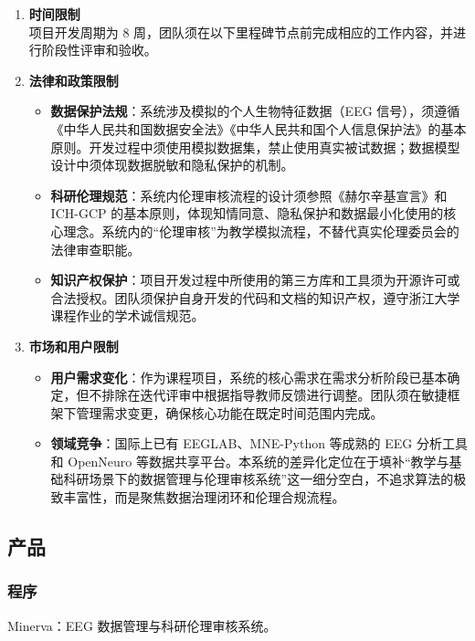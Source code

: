 \begin{enumerate}[(1)]
  \item \textbf{时间限制}\\
  项目开发周期为 8 周，团队须在以下里程碑节点前完成相应的工作内容，并进行阶段性评审和验收。

  \item \textbf{法律和政策限制}
    \begin{itemize}
      \item \textbf{数据保护法规}：系统涉及模拟的个人生物特征数据（EEG 信号），须遵循《中华人民共和国数据安全法》《中华人民共和国个人信息保护法》的基本原则。开发过程中须使用模拟数据集，禁止使用真实被试数据；数据模型设计中须体现数据脱敏和隐私保护的机制。
      \item \textbf{科研伦理规范}：系统内伦理审核流程的设计须参照《赫尔辛基宣言》和 ICH-GCP 的基本原则，体现知情同意、隐私保护和数据最小化使用的核心理念。系统内的“伦理审核”为教学模拟流程，不替代真实伦理委员会的法律审查职能。
      \item \textbf{知识产权保护}：项目开发过程中所使用的第三方库和工具须为开源许可或合法授权。团队须保护自身开发的代码和文档的知识产权，遵守浙江大学课程作业的学术诚信规范。
    \end{itemize}

  \item \textbf{市场和用户限制}
    \begin{itemize}
      \item \textbf{用户需求变化}：作为课程项目，系统的核心需求在需求分析阶段已基本确定，但不排除在迭代评审中根据指导教师反馈进行调整。团队须在敏捷框架下管理需求变更，确保核心功能在既定时间范围内完成。
      \item \textbf{领域竞争}：国际上已有 EEGLAB、MNE-Python 等成熟的 EEG 分析工具和 OpenNeuro 等数据共享平台。本系统的差异化定位在于填补“教学与基础科研场景下的数据管理与伦理审核系统”这一细分空白，不追求算法的极致丰富性，而是聚焦数据治理闭环和伦理合规流程。
    \end{itemize}
\end{enumerate}

\subsection{产品}

\subsubsection{程序}

Minerva：EEG 数据管理与科研伦理审核系统。

